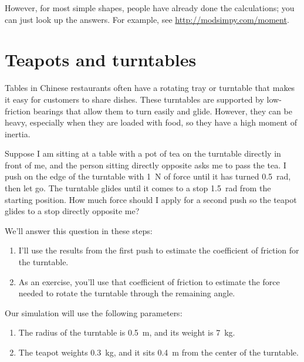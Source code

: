 \documentclass[12pt]{book}
\theoremstyle{exercise}
\begin{document}
However, for most simple shapes, people have already done the calculations; you can just look up the answers.  For example, see \url{http://modsimpy.com/moment}.


\section{Teapots and turntables}

Tables in Chinese restaurants often have a rotating tray or turntable
that makes it easy for customers to share dishes. These turntables are
supported by low-friction bearings that allow them to turn easily and
glide. However, they can be heavy, especially when they are loaded with
food, so they have a high moment of inertia.


Suppose I am sitting at a table with a pot of tea on the turntable
directly in front of me, and the person sitting directly opposite asks
me to pass the tea. I push on the edge of the turntable with \SI{1}{\newton} of force until it has turned \SI{0.5}{\radian}, then let go. The turntable glides until it comes to a stop \SI{1.5}{\radian} from the starting position. How much force should I apply for a second push so the teapot glides to a
stop directly opposite me?


We'll answer this question in these steps:

\begin{enumerate}

\item
  I'll use the results from the first push to estimate the coefficient
  of friction for the turntable.

\item
  As an exercise, you'll use that coefficient of friction to estimate the force needed to rotate the turntable through the remaining angle.

\end{enumerate}

Our simulation will use the following parameters:

\begin{enumerate}
\item
  The radius of the turntable is \SI{0.5}{\meter}, and its weight is \SI{7}{\kg}.
\item
  The teapot weights \SI{0.3}{\kg}, and it sits \SI{0.4}{\meter} from the center of
  the turntable.
\end{enumerate}
\end{document}
